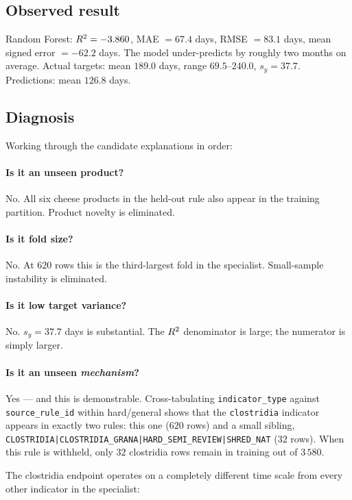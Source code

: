 \subsection{Observed result}

Random Forest: $R^2 = -3.860$, MAE $= 67.4$ days, RMSE $= 83.1$ days, mean
signed error $= -62.2$ days. The model under-predicts by roughly two months
on average. Actual targets: mean $189.0$ days, range $69.5$--$240.0$,
$s_y = 37.7$. Predictions: mean $126.8$ days.

\subsection{Diagnosis}

Working through the candidate explanations in order:

\paragraph{Is it an unseen product?} No. All six cheese products in the
held-out rule also appear in the training partition. Product novelty is
eliminated.

\paragraph{Is it fold size?} No. At $620$ rows this is the third-largest
fold in the specialist. Small-sample instability is eliminated.

\paragraph{Is it low target variance?} No. $s_y = 37.7$ days is
substantial. The $R^2$ denominator is large; the numerator is simply
larger.

\paragraph{Is it an unseen \emph{mechanism}?} Yes --- and this is
demonstrable. Cross-tabulating \texttt{indicator\_type} against
\texttt{source\_rule\_id} within hard/general shows that the
\texttt{clostridia} indicator appears in exactly two rules: this one
($620$ rows) and a small sibling,
\texttt{CLOSTRIDIA|CLOSTRIDIA\_GRANA|HARD\_SEMI\_REVIEW|SHRED\_NAT}
($32$ rows). When this rule is withheld, only $32$ clostridia rows remain
in training out of $3\,580$.

The clostridia endpoint operates on a completely different time scale from
every other indicator in the specialist:

